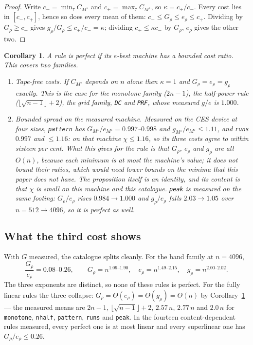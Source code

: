 \documentclass[11pt]{article}
\newtheorem{corollary}{Corollary}
\theoremstyle{remark}
\begin{document}
\begin{proof}
Write $c_-=\min_\tau C_{M^{\star}}$ and $c_+=\max_\tau C_{M^{\star}}$, so $\kappa=c_+/c_-$.  Every
cost lies in $[c_-,c_+]$, hence so does every mean of them: $c_-\le G_\rho\le e_\rho\le c_+$.  Dividing
by $G_\rho\ge c_-$ gives $g_\rho/G_\rho\le c_+/c_-=\kappa$; dividing $c_+\le\kappa c_-$ by $G_\rho$,
$e_\rho$ gives the other two.
\end{proof}

\begin{corollary}\label{cor:perfect}
A rule is perfect if its $e$-best machine has a bounded cost ratio.  This covers two families.
\begin{enumerate}
\item \emph{Tape-free costs.}  If $C_{M^{\star}}$ depends on $n$ alone then $\kappa=1$ and
$G_\rho=e_\rho=g_\rho$ exactly.  This is the case for the monotone family ($2n-1$), the half-power
rule ($\lfloor\sqrt{n-1}\rfloor+2$), the grid family, \texttt{DC} and \texttt{PRF}, whose measured
$g/e$ is $1.000$.
\item \emph{Bounded spread on the measured machine.}  Measured on the CES device at four sizes,
\texttt{pattern} has $G_{M^{\star}}/e_{M^{\star}}=0.997$--$0.998$ and
$g_{M^{\star}}/e_{M^{\star}}\le1.11$, and \texttt{runs} $0.997$ and $\le1.16$: on that machine
$\chi\le1.16$, so its three costs agree to within sixteen per cent.  What this gives for the rule is
that $G_\rho$, $e_\rho$ and $g_\rho$ are all $O(n)$, because each minimum is at most the machine's
value; it does not bound their ratios, which would need lower bounds on the minima that this paper
does not have.  The proposition itself is an identity, and its content is that $\chi$ is small on
this machine and this catalogue.  \texttt{peak} is measured on the same footing: $G_\rho/e_\rho$ rises $0.984\to1.000$
and $g_\rho/e_\rho$ falls $2.03\to1.05$ over $n=512\to4096$, so it is perfect as well.
\end{enumerate}
\end{corollary}

\subsection*{What the third cost shows}

With $G$ measured, the catalogue splits cleanly.  For the band family at $n=4096$,
\begin{equation}
  \frac{G_\rho}{e_\rho}=0.08\text{--}0.26,
  \qquad
  G_\rho=n^{1.09\text{--}1.90},\quad
  e_\rho=n^{1.49\text{--}2.15},\quad
  g_\rho=n^{2.00\text{--}2.02}.
\end{equation}
The three exponents are distinct, so none of these rules is perfect.  For the fully linear rules the
three collapse: $G_\rho=\Theta(e_\rho)=\Theta(g_\rho)=\Theta(n)$ by Corollary~\ref{cor:perfect} ---
the measured means are $2n-1$, $\lfloor\sqrt{n-1}\rfloor+2$, $2.57\,n$, $2.77\,n$ and $2.0\,n$ for
\texttt{monotone}, \texttt{nhalf}, \texttt{pattern}, \texttt{runs} and \texttt{peak}.  In
the fourteen content-dependent rules measured, every perfect one is at most linear and every
superlinear one has $G_\rho/e_\rho\le0.26$.
\end{document}

